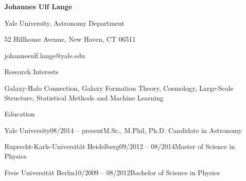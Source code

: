 \documentclass[11pt]{resume} %
\begin{document}
\centerline{\color{blue} \LARGE \bf Johannes Ulf Lange}
\centerline{Yale University, Astronomy Department}
\centerline{52 Hillhouse Avenue, New Haven, CT 06511}
\centerline{johannesulf.lange@yale.edu}
\bigskip

\begin{rSection}{Research Interests}
  \begin{adjustwidth}{0.5cm}{}
    Galaxy-Halo Connection, Galaxy Formation Theory, Cosmology, Large-Scale Structure, Statistical Methods and Machine Learning
  \end{adjustwidth}
\end{rSection}


\begin{rSection}{Education}
  \begin{adjustwidth}{0.5cm}{}
    \begin{rSubsection}{Yale University}{08/2014 -- present}{M.Sc., M.Phil, Ph.D. Candidate in Astronomy}{}\end{rSubsection}

    \begin{rSubsection}{Ruprecht-Karls-Universität Heidelberg}{09/2012 -- 08/2014}{Master of Science in Physics}{}\end{rSubsection}

    \begin{rSubsection}{Freie Universität Berlin}{10/2009 -- 08/2012}{Bachelor of Science in Physics}{}\end{rSubsection}
  \end{adjustwidth}
\end{rSection}
\end{document}
